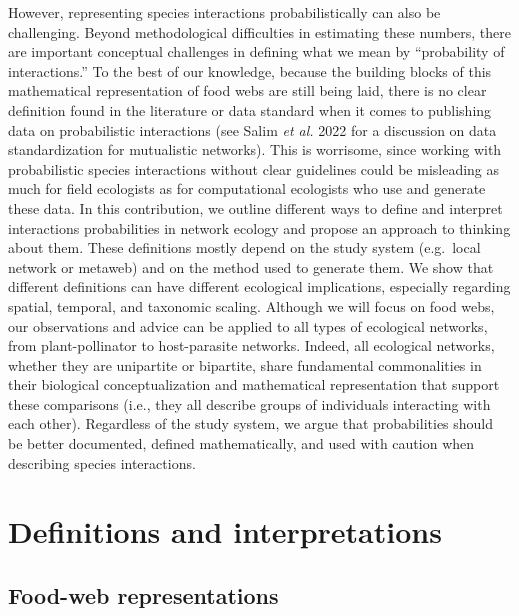 \documentclass[11pt]{article}
\begin{document}
However, representing species interactions probabilistically can also be
challenging. Beyond methodological difficulties in estimating these
numbers, there are important conceptual challenges in defining what we
mean by ``probability of interactions.'' To the best of our knowledge,
because the building blocks of this mathematical representation of food
webs are still being laid, there is no clear definition found in the
literature or data standard when it comes to publishing data on
probabilistic interactions (see Salim \emph{et al.} 2022 for a
discussion on data standardization for mutualistic networks). This is
worrisome, since working with probabilistic species interactions without
clear guidelines could be misleading as much for field ecologists as for
computational ecologists who use and generate these data. In this
contribution, we outline different ways to define and interpret
interactions probabilities in network ecology and propose an approach to
thinking about them. These definitions mostly depend on the study system
(e.g.~local network or metaweb) and on the method used to generate them.
We show that different definitions can have different ecological
implications, especially regarding spatial, temporal, and taxonomic
scaling. Although we will focus on food webs, our observations and
advice can be applied to all types of ecological networks, from
plant-pollinator to host-parasite networks. Indeed, all ecological
networks, whether they are unipartite or bipartite, share fundamental
commonalities in their biological conceptualization and mathematical
representation that support these comparisons (i.e., they all describe
groups of individuals interacting with each other). Regardless of the
study system, we argue that probabilities should be better documented,
defined mathematically, and used with caution when describing species
interactions.

\hypertarget{definitions-and-interpretations}{%
\section{Definitions and
interpretations}\label{definitions-and-interpretations}}

\hypertarget{food-web-representations}{%
\subsection{Food-web representations}\label{food-web-representations}}
\end{document}
